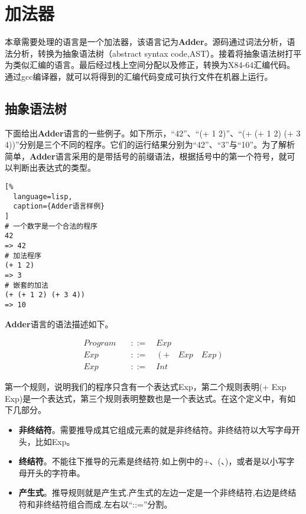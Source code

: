 \chapter{加法器}

本章需要处理的语言是一个加法器，该语言记为\textbf{Adder}。源码通过词法分析，语法分析，转换为抽象语法树（abstract syntax code,AST）。接着将抽象语法树打平为类似汇编的语言。最后经过栈上空间分配以及修正，转换为X84-64汇编代码。通过gcc编译器，就可以将得到的汇编代码变成可执行文件在机器上运行。

\section{抽象语法树}

下面给出\textbf{Adder}语言的一些例子。如下所示，“42”、“(+ 1 2)”、“(+ (+ 1 2) (+ 3 4))”分别是三个不同的程序。它们的运行结果分别为“42”、“3”与“10”。为了解析简单，\textbf{Adder}语言采用的是带括号的前缀语法，根据括号中的第一个符号，就可以判断出表达式的类型。

\begin{lstlisting}[%
  language=lisp,
  caption={Adder语言样例}
]
# 一个数字是一个合法的程序
42
=> 42
# 加法程序
(+ 1 2)
=> 3
# 嵌套的加法
(+ (+ 1 2) (+ 3 4))
=> 10
\end{lstlisting}


\textbf{Adder}语言的语法描述如下。

\begin{equation}
\begin{aligned}
  \label{eq:1}
   Program \quad &::= \quad Exp \\
   Exp \quad &::= \quad (+ \quad Exp \quad Exp) \\
   Exp \quad &::=  \quad Int
\end{aligned}
\end{equation}

第一个规则，说明我们的程序只含有一个表达式Exp，第二个规则表明(+ Exp Exp)是一个表达式，第三个规则表明整数也是一个表达式。在这个定义中，有如下几部分。

\begin{itemize}
  \item \textbf{非终结符}。需要推导成其它组成元素的就是非终结符。非终结符以大写字母开头，比如Exp。
  \item \textbf{终结符}。不能往下推导的元素是终结符.如上例中的+、(、)，或者是以小写字母开头的字符串。
  \item \textbf{产生式}。推导规则就是产生式.产生式的左边一定是一个非终结符,右边是终结符和非终结符组合而成.左右以“::=”分割。
\end{itemize}

